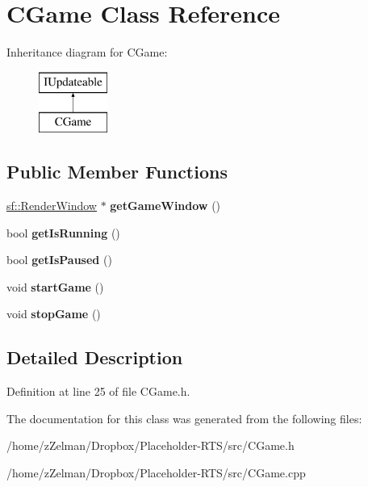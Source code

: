 \hypertarget{classCGame}{\section{C\-Game Class Reference}
\label{classCGame}
}
Inheritance diagram for C\-Game\-:\begin{figure}[H]
\begin{center}
\leavevmode
\includegraphics[height=2.000000cm]{classCGame}
\end{center}
\end{figure}
\subsection*{Public Member Functions}
\begin{DoxyCompactItemize}
\item 
\hypertarget{classCGame_a9ed0bb7ef800bc7e568cf8858c3b96ec}{\hyperlink{classsf_1_1RenderWindow}{sf\-::\-Render\-Window} $\ast$ {\bfseries get\-Game\-Window} ()}\label{classCGame_a9ed0bb7ef800bc7e568cf8858c3b96ec}

\item 
\hypertarget{classCGame_ae45938d7b77b13d2e80e4f9b3a17a44a}{bool {\bfseries get\-Is\-Running} ()}\label{classCGame_ae45938d7b77b13d2e80e4f9b3a17a44a}

\item 
\hypertarget{classCGame_a9b2f241693b1f024c957f92069fe6ed7}{bool {\bfseries get\-Is\-Paused} ()}\label{classCGame_a9b2f241693b1f024c957f92069fe6ed7}

\item 
\hypertarget{classCGame_aa94f04e2c012603f10430a4d4db3ce27}{void {\bfseries start\-Game} ()}\label{classCGame_aa94f04e2c012603f10430a4d4db3ce27}

\item 
\hypertarget{classCGame_acbad86ee58748e2db0da540f4aa0640e}{void {\bfseries stop\-Game} ()}\label{classCGame_acbad86ee58748e2db0da540f4aa0640e}

\end{DoxyCompactItemize}


\subsection{Detailed Description}


Definition at line 25 of file C\-Game.\-h.



The documentation for this class was generated from the following files\-:\begin{DoxyCompactItemize}
\item 
/home/z\-Zelman/\-Dropbox/\-Placeholder-\/\-R\-T\-S/src/C\-Game.\-h\item 
/home/z\-Zelman/\-Dropbox/\-Placeholder-\/\-R\-T\-S/src/C\-Game.\-cpp\end{DoxyCompactItemize}
